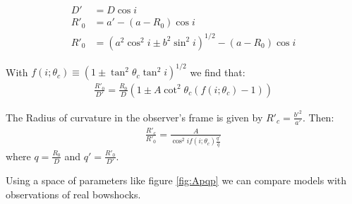 \begin{align}
D' &= D\cos i \\
R'_0 &= a' - (a-R_0)\cos i \\
R'_0 &= \left(a^2\cos^2 i \pm b^2\sin^2 i\right)^{1/2}  - (a-R_0)\cos i
\end{align}

With  $f(i;\theta_c)\equiv\left(1\pm\tan^2\theta_c\tan^2i\right)^{1/2}$ we find that:
\begin{align}
\frac{R'_0}{D'}=\frac{R_0}{D}\left(1\pm A\cot^2\theta_c(f(i;\theta_c)-1) \right)
\label{eq:qprime}
\end{align}

The Radius of curvature in the observer's frame is given by $R'_c=\frac{b'^2}{a'}$. Then:
\begin{align}
  \frac{R'_c}{R'_0} = \frac{A}{\cos^2 i f(i;\theta_c)\frac{q'}{q}}
  \label{eq:Aprime}
\end{align}
where $q=\frac{R_0}{D}$ and $q' = \frac{R'_0}{D'}$. 

Using a space of parameters like figure \ref{fig:Apqp} we can compare models with observations of real bowshocks.


 

